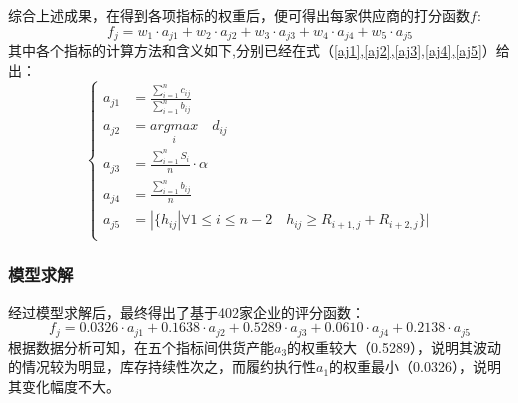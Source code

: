 \documentclass{my_paper}
\begin{document}
综合上述成果，在得到各项指标的权重后，便可得出每家供应商的打分函数$f$:
\begin{equation}
f_j = w_1\cdot a_{j1}+w_2\cdot a_{j2}+w_3\cdot a_{j3}+w_4\cdot a_{j4}+w_5\cdot a_{j5}
\label{fj}
\end{equation}
其中各个指标的计算方法和含义如下,分别已经在式（\ref{aj1},\ref{aj2},\ref{aj3},\ref{aj4},\ref{aj5}）给出：
$$\begin{cases}
    a_{j1}&=\frac{\sum\limits^n_{i=1}c_{ij}}{\sum\limits^n_{i=1}b_{ij}}\\
    a_{j2}&=\underset{i}{argmax}\quad d_{ij}\\
    a_{j3}&=\frac{\sum\limits^n_{i=1} S_i}{n}\cdot \alpha\\
    a_{j4}&=\frac{\sum\limits^n_{i=1}b_{ij}}{n}\\
    a_{j5}& = |\{ h_{ij} |\forall 1\leq i \leq n-2 \quad h_{ij}\geq R_{i+1,j}+R_{i+2,j}\}|\\
\end{cases}$$


\subsubsection{模型求解}
经过模型求解后，最终得出了基于402家企业的评分函数：
$$f_j = 0.0326\cdot a_{j1}+0.1638\cdot a_{j2}+0.5289\cdot a_{j3}+0.0610\cdot a_{j4}+0.2138\cdot a_{j5}$$
根据数据分析可知，在五个指标间供货产能$a_{3}$的权重较大（0.5289），说明其波动的情况较为明显，库存持续性次之，而履约执行性$a_1$的权重最小（0.0326），说明其变化幅度不大。
\end{document}
